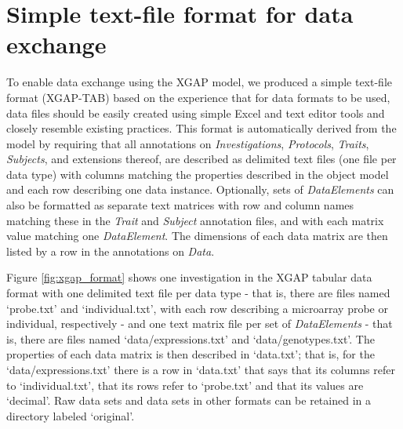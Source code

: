 \section{Simple text-file format for data exchange}
To enable data exchange using the XGAP model, we produced a simple text-file format (XGAP-TAB) based on the experience that for data formats to be used, data files should be easily created using simple Excel and text editor tools and closely resemble existing practices.
This format is automatically derived from the model by requiring that all annotations on \textsl{Investigations}, \textsl{Protocols}, \textsl{Traits}, \textsl{Subjects}, and extensions thereof, are described as delimited text files (one file per data type) with columns matching the properties described in the object model and each row describing one data instance.
Optionally, sets of \textsl{DataElements} can also be formatted as separate text matrices with row and column names matching these in the \textsl{Trait} and \textsl{Subject} annotation files, and with each matrix value matching one \textsl{DataElement}.
The dimensions of each data matrix are then listed by a row in the annotations on \textsl{Data}.

Figure \ref{fig:xgap_format} shows one investigation in the XGAP tabular data format with one delimited text file per data type - that is, there are files named ‘probe.txt’ and ‘individual.txt’, with each row describing a microarray probe or individual, respectively - and one text matrix file per set of \textsl{DataElements} - that is, there are files named ‘data/expressions.txt’ and ‘data/genotypes.txt’.
The properties of each data matrix is then described in ‘data.txt’; that is, for the ‘data/expressions.txt’ there is a row in ‘data.txt’ that says that its columns refer to ‘individual.txt’, that its rows refer to ‘probe.txt’ and that its values are ‘decimal’.
Raw data sets and data sets in other formats can be retained in a directory labeled ‘original’.

